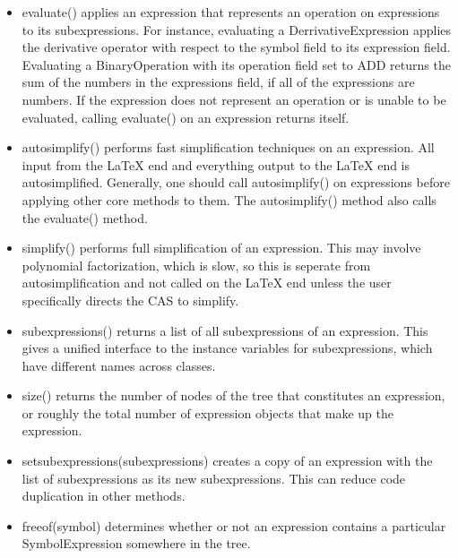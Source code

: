 \documentclass{article}
\begin{document}
\begin{itemize}
    \item {\ttfamily evaluate()} applies an expression that represents an operation on expressions to its subexpressions. For instance, evaluating a {\ttfamily DerrivativeExpression} applies the derivative operator with respect to the {\ttfamily symbol} field to its {\ttfamily expression} field. Evaluating a {\ttfamily BinaryOperation} with its {\ttfamily operation} field set to {\ttfamily ADD} returns the sum of the numbers in the {\ttfamily expressions} field, if all of the expressions are numbers. If the expression does not represent an operation or is unable to be evaluated, calling {\ttfamily evaluate()} on an expression returns itself.
    
    \item {\ttfamily autosimplify()} performs fast simplification techniques on an expression. All input from the \LaTeX{} end and everything output to the \LaTeX{} end is autosimplified. Generally, one should call {\ttfamily autosimplify()} on expressions before applying other core methods to them. The {\ttfamily autosimplify()} method also calls the {\ttfamily evaluate()} method.
    
    \item {\ttfamily simplify()} performs full simplification of an expression. This may involve polynomial factorization, which is slow, so this is seperate from autosimplification and not called on the \LaTeX{} end unless the user specifically directs the CAS to simplify.
    
    \item {\ttfamily subexpressions()} returns a list of all subexpressions of an expression. This gives a unified interface to the instance variables for subexpressions, which have different names across classes.
    
    \item {\ttfamily size()} returns the number of nodes of the tree that constitutes an expression, or roughly the total number of expression objects that make up the expression.
    
    \item {\ttfamily setsubexpressions(subexpressions)} creates a copy of an expression with the list of subexpressions as its new subexpressions. This can reduce code duplication in other methods.
    
    \item {\ttfamily freeof(symbol)} determines whether or not an expression contains a particular \\ {\ttfamily SymbolExpression} somewhere in the tree.
    

\end{itemize}
\end{document}
